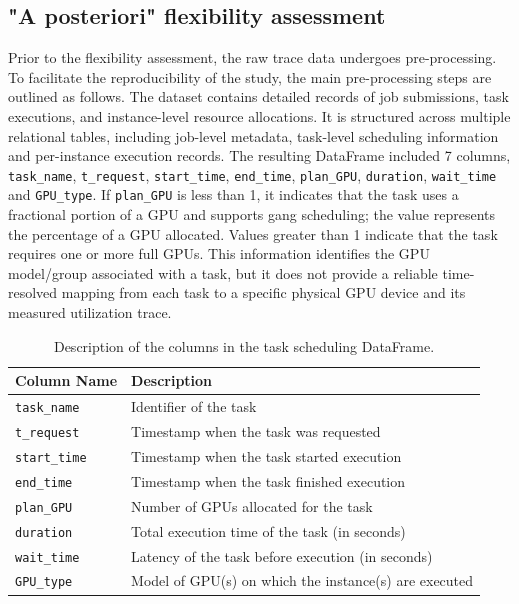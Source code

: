 \documentclass[preprint,12pt]{elsarticle}
\begin{document}
\subsection{"A posteriori" flexibility assessment} \label{a_posteriori}
Prior to the flexibility assessment, the raw trace data undergoes pre-processing. To facilitate the reproducibility of the study, the main pre-processing steps are outlined as follows. The dataset contains detailed records of job submissions, task executions, and instance-level resource allocations. It is structured across multiple relational tables, including job-level metadata, task-level scheduling information and per-instance execution records. The resulting DataFrame included 7 columns, \texttt{task\_name}, \texttt{t\_request}, \texttt{start\_time}, \texttt{end\_time}, \texttt{plan\_GPU}, \texttt{duration}, \texttt{wait\_time} and \texttt{GPU\_type}. If \texttt{plan\_GPU} is less than 1, it indicates that the task uses a fractional portion of a GPU and supports gang scheduling; the value represents the percentage of a GPU allocated. Values greater than 1 indicate that the task requires one or more full GPUs. This information identifies the GPU model/group associated with a task, but it does not provide a reliable time-resolved mapping from each task to a specific physical GPU device and its measured utilization trace.

\begin{table}[h!]
\centering
\begin{tabular}{ll}
\toprule
\textbf{Column Name} & \textbf{Description} \\
\midrule
\texttt{task\_name}   & Identifier of the task \\
\texttt{t\_request}   & Timestamp when the task was requested \\
\texttt{start\_time}  & Timestamp when the task started execution \\
\texttt{end\_time}    & Timestamp when the task finished execution \\
\texttt{plan\_GPU}    & Number of GPUs allocated for the task \\
\texttt{duration}     & Total execution time of the task (in seconds) \\
\texttt{wait\_time}   & Latency of the task before execution (in seconds)  \\
\texttt{GPU\_type}    & Model of GPU(s) on which the instance(s) are executed \\
\bottomrule
\end{tabular}
\caption{Description of the columns in the task scheduling DataFrame.}
\label{tab:df_columns}
\end{table}
\end{document}
